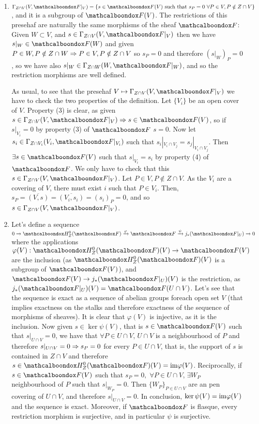 \begin{sol}
	\begin{enumerate}[label=\alph*)]
		\item $\Gamma_{Z \cap V} (V,\sF|_V) = \{s \in \sF(V) \text{ such that } s_P = 0 \, \, \forall P \in V, P \notin Z \cap V\}$, and it is a subgroup of $\sF(V)$. The restrictions of this presehaf are naturally the same morphisms of the sheaf $\sF$: Given $W \subset V$, and $s \in \Gamma_{Z \cap V} (V,\sF|_V)$ then we have $s|_W \in \sF(W)$ and given $P \in W, P \notin Z \cap W \Rightarrow P \in V, P \notin Z \cap V$ so $s_P = 0$ and therefore $(s|_W)_P = 0$, so we have also $s|_W \in \Gamma_{Z \cap W} (W,\sF|_W)$, and so the restriction morphisms are well defined. 

		As usual, to see that the presehaf $V \mapsto \Gamma_{Z \cap V} (V,\sF|_V)$ we have to check the two properties of the definition. Let $\{V_i\}$ be an open cover of $V$. Property (3) is clear, as given $s \in \Gamma_{Z \cap V} (V,\sF|_V) \imp s \in \sF(V)$, so if $s|_{V_i} = 0$ by property (3) of $\sF$ $s = 0$. Now let $s_i \in \Gamma_{Z \cap V_i} (V_i,\sF|_{V_i})$ such that $s_i|_{V_i \cap V_j} = s_j|_{V_i \cap V_j}$. Then $\exists s \in \sF(V)$ such that $s|_{V_i} = s_i$ by property (4) of $\sF$. We only have to check that this $s \in \Gamma_{Z \cap V} (V,\sF|_V)$. Let $P \in V, P \notin Z \cap V$. As the $V_i$ are a covering of $V$, there must exist $i$ such that $P \in V_i$. Then, $s_P = \overline{(V,s)} = \overline{(V_i, s_i)} = (s_i)_P = 0$, and so $s \in \Gamma_{Z \cap V}(V,\sF|_V)$.

		\item Let's define a sequence $0 \xrightarrow[]{} \sH_Z^0(\sF) \xrightarrow[]{\varphi} \sF \xrightarrow[]{\psi} j_*(\sF|_U) \xrightarrow[]{} 0$ where the applications $\varphi(V): \sH_Z^0(\sF)(V) \to \sF(V)$ are the inclusion (as $\sH_Z^0(\sF)(V)$ is a subgroup of $\sF(V)$), and $\sF(V) \to j_*(\sF|_U)(V)$ is the restriction, as $j_*(\sF|_U)(V) = \sF(U \cap V)$. Let's see that the sequence is exact as a sequence of abelian groups foreach open set $V$ (that implies exactness on the stalks and therefore exactness of the sequence of morphisms of sheaves). It is clear that $\varphi(V)$ is injective, as it is the inclusion. Now given $s \in \ker \psi(V)$, that is $s \in \sF(V)$ such that $s|_{U \cap V} = 0$, we have that $\forall P \in U \cap V$, $U \cap V$ is a neighbourhood of $P$ and therefore $s|_{U \cap V} = 0 \Rightarrow s_P = 0$ for every $P \in U \cap V$, that is, the support of $s$ is contained in $Z \cap V$ and therefore $s \in \sH^0_{Z}(\sF)(V) = \ima \varphi(V)$. Reciprocally, if $s \in \sF(V)$ such that $s_P = 0, \, \, \forall P \in U \cap V$, $\exists W_P$ neighbourhood of $P$ such that $s|_{W_P} = 0$. Then $\{W_P\}_{P \in U \cap V}$ are an pen covering of $U \cap V$, and therefore $s|_{U \cap V} = 0$. In conclusion, $\ker \psi(V) = \mathrm{im} \varphi(V)$ and the sequence is exact. Moreover, if $\sF$ is flasque, every restriction morphism is surjective, and in particular $\psi$ is surjective.
	\end{enumerate}
\end{sol}

